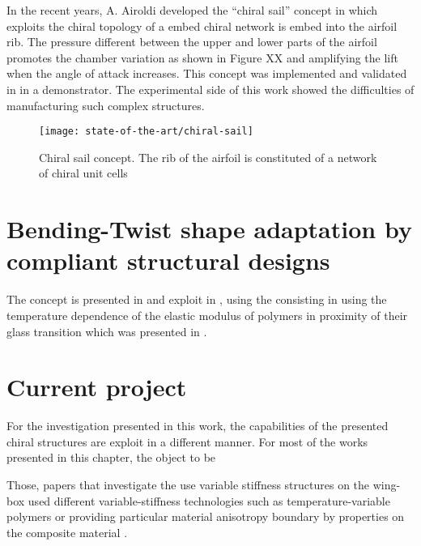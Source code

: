   In the recent years, A. Airoldi developed the ``chiral sail'' concept in \cite{Airoldi2012} which exploits the chiral topology of a embed chiral network is embed into the airfoil rib. The pressure different between the upper and lower parts of the airfoil promotes the chamber variation as shown in Figure XX and amplifying the lift when the angle of attack increases. This concept was implemented and validated in \cite{Airoldi2015a} in a demonstrator. The experimental side of this work showed the difficulties of manufacturing such complex structures.

  \begin{figure}[!htpb]
    \centering
    \texttt{[image: state-of-the-art/chiral-sail]}
    \caption[Chiral sail concept]{Chiral sail concept. The rib of the airfoil is constituted of a network of chiral unit cells \cite{Airoldi2012}}\label{fig:truss-core-prototype}
  \end{figure}  

  \clearpage
  \section{Bending-Twist shape adaptation by compliant structural designs}
  

  The concept is presented in \cite{Raither2013a} and exploit in \cite{Raither2013}, using the consisting in using the temperature dependence of the elastic modulus of polymers in proximity of their glass transition which was presented in \cite{Raither2012}. 

  \clearpage
  \section{Current project}

  For the investigation presented in this work, the capabilities of the presented chiral structures are exploit in a different manner. For most of the works presented in this chapter, the object to be 

  Those, papers that investigate the use variable stiffness structures on the wing-box used different variable-stiffness technologies such as temperature-variable polymers or providing particular material anisotropy boundary by properties on the composite material .

